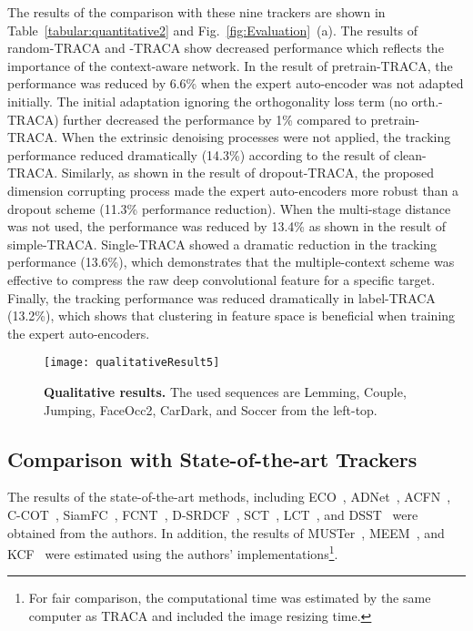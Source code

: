 \documentclass[10pt,twocolumn,letterpaper]{article}
\begin{document}
The results of the comparison with these nine trackers are shown in Table~\ref{tabular:quantitative2} and Fig.~\ref{fig:Evaluation}~(a).
The results of random-TRACA and -TRACA show decreased performance which reflects the importance of the context-aware network.
In the result of pretrain-TRACA, the performance was reduced by 6.6\% when the expert auto-encoder was not adapted initially.
The initial adaptation ignoring the orthogonality loss term (no orth.-TRACA) further decreased the performance by 1\% compared to pretrain-TRACA.
When the extrinsic denoising processes were not applied, the tracking performance reduced dramatically (14.3\%) according to the result of clean-TRACA.
Similarly, as shown in the result of dropout-TRACA, the proposed dimension corrupting process made the expert auto-encoders more robust than a dropout scheme (11.3\% performance reduction).
When the multi-stage distance was not used, the performance was reduced by 13.4\% as shown in the result of simple-TRACA.
Single-TRACA showed a dramatic reduction in the tracking performance (13.6\%), which demonstrates that the multiple-context scheme was effective to compress the raw deep convolutional feature for a specific target.
Finally, the tracking performance was reduced dramatically in label-TRACA (13.2\%), which shows that clustering in feature space is beneficial when training the expert auto-encoders.

\begin{figure}[t]
\centering
    \texttt{[image: qualitativeResult5]}
    \caption{ {\bf{Qualitative results.}}  The used sequences are {{Lemming}}, {{Couple}}, {{Jumping}}, {{FaceOcc2}}, {{CarDark}}, and {{Soccer}} from the left-top.}
    \label{fig:Qualitative}    
    \vspace{-4mm}
\end{figure}

\subsection{Comparison with State-of-the-art Trackers}
The results of the state-of-the-art methods, including ECO~\cite{ref:ECO}, ADNet~\cite{ref:yun}, ACFN~\cite{ref:ACFN}, C-COT~\cite{ref:COT}, SiamFC~\cite{ref:SiamFC}, FCNT~\cite{ref:FCNT}, D-SRDCF~\cite{ref:DeepSRDCF}, SCT~\cite{ref:SCT}, LCT~\cite{ref:LongCT}, and DSST~\cite{ref:DSST} were obtained from the authors.
In addition, the results of MUSTer~\cite{ref:MUSTer}, MEEM~\cite{ref:MEEM}, and KCF~\cite{ref:KCF} were estimated using the authors' implementations\footnote{For fair comparison, the computational time was estimated by the same computer as \ac{TRACA} and included the image resizing time.}.
\end{document}
